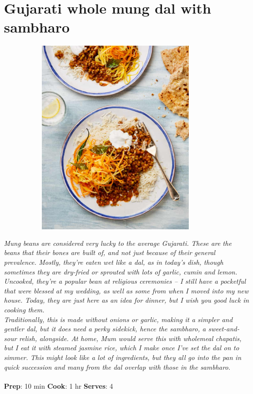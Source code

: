 \documentclass{book}
\begin{document}
\section{Gujarati whole mung dal with sambharo}
\begin{figure}
\centering\includegraphics[width=10cm,height=10cm,keepaspectratio]{Recipe_Pictures/Gujarati_whole_mung_dal_with_sambharo.png}
\end{figure}
\emph{Mung beans are considered very lucky to the average Gujarati. These are the beans that their bones are built of, and not just because of their general prevalence. Mostly, they’re eaten wet like a dal, as in today’s dish, though sometimes they are dry-fried or sprouted with lots of garlic, cumin and lemon. Uncooked, they’re a popular bean at religious ceremonies – I still have a pocketful that were blessed at my wedding, as well as some from when I moved into my new house. Today, they are just here as an idea for dinner, but I wish you good luck in cooking them.\\ 
Traditionally, this is made without onions or garlic, making it a simpler and gentler dal, but it does need a perky sidekick, hence the sambharo, a sweet-and-sour relish, alongside. At home, Mum would serve this with wholemeal chapatis, but I eat it with steamed jasmine rice, which I make once I’ve set the dal on to simmer. This might look like a lot of ingredients, but they all go into the pan in quick succession and many from the dal overlap with those in the sambharo.}\\\\ 
\textbf{Prep}: 10 min
\textbf{Cook}: 1 hr
\textbf{Serves}: 4
\end{document}
